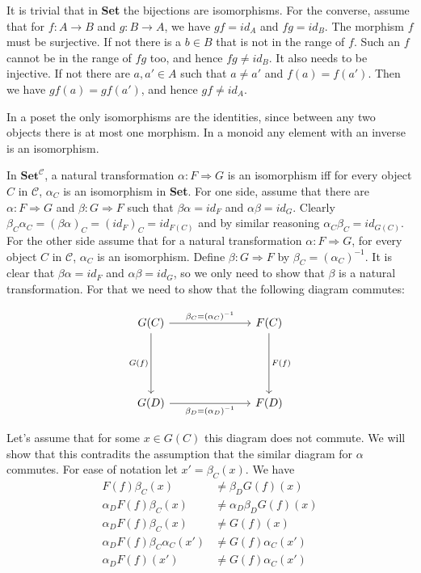 It is trivial that in \textbf{Set} the bijections are isomorphisms. For the converse, assume that for $f:A\to B$ and $g:B\to A$, we have $gf=id_A$ and $fg=id_B$. The morphism $f$ must be surjective. If not there is a $b\in B$ that is not in the range of $f$. Such an $f$ cannot be in the range of $fg$ too, and hence $fg\neq id_B$. It also needs to be injective. If not there are $a,a'\in A$ such that $a\neq a'$ and $f(a)=f(a')$. Then we have $gf(a)=gf(a')$, and hence $gf\neq id_A$.

In a poset the only isomorphisms are the identities, since between any two objects there is at most one morphism. In a monoid any element with an inverse is an isomorphism.

In $\textbf{Set}^\mathcal{C}$, a natural transformation $\alpha:F\Rightarrow G$ is an isomorphism iff for every object $C$ in $\mathcal{C}$, $\alpha_C$ is an isomorphism in \textbf{Set}. For one side, assume that there are $\alpha:F\Rightarrow G$ and $\beta:G\Rightarrow F$ such that $\beta\alpha=id_F$ and $\alpha\beta=id_G$. Clearly $\beta_C\alpha_C=(\beta\alpha)_C=(id_F)_C=id_{F(C)}$ and by similar reasoning $\alpha_C\beta_C=id_{G(C)}$. For the other side assume that for a natural transformation $\alpha:F\Rightarrow G$, for every object $C$ in $\mathcal{C}$, $\alpha_C$ is an isomorphism. Define $\beta:G\Rightarrow F$ by $\beta_C=(\alpha_C)^{-1}$. It is clear that $\beta\alpha=id_F$ and $\alpha\beta=id_G$, so we only need to show that $\beta$ is a natural transformation.
For that we need to show that the following diagram commutes:

\[\begin{tikzcd}
	{G(C)} &&& {F(C)} \\
	\\
	\\
	{G(D)} &&& {F(D)}
	\arrow["{\beta_C=(\alpha_C)^{-1}}", from=1-1, to=1-4]
	\arrow["{F(f)}", from=1-4, to=4-4]
	\arrow["{G(f)}"', from=1-1, to=4-1]
	\arrow["{\beta_D=(\alpha_D)^{-1}}"', from=4-1, to=4-4]
\end{tikzcd}\]

Let's assume that for some $x\in G(C)$ this diagram does not commute. We will show that this contradits the assumption that the similar diagram for $\alpha$ commutes. For ease of notation let $x'=\beta_C(x)$. We have
\begin{align*}
F(f)\beta_C(x)&\neq\beta_DG(f)(x)\\
\alpha_DF(f)\beta_C(x)&\neq\alpha_D\beta_DG(f)(x)\\
\alpha_DF(f)\beta_C(x)&\neq G(f)(x)\\
\alpha_DF(f)\beta_C\alpha_C(x')&\neq G(f)\alpha_C(x')\\
\alpha_DF(f)(x')&\neq G(f)\alpha_C(x')
\end{align*}
